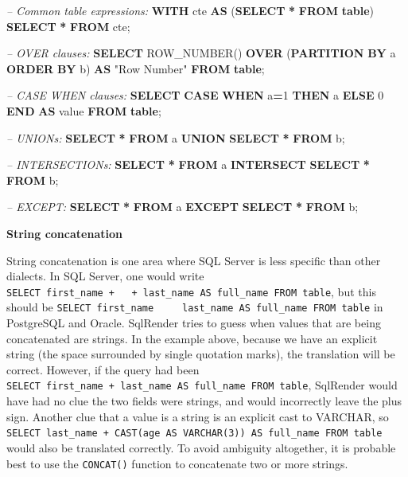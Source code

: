 \documentclass[11pt]{book}
\newenvironment{Shaded}{\begin{snugshade}}{\end{snugshade}}
\newcommand{\CommentTok}[1]{\textcolor[rgb]{0.56,0.35,0.01}{\textit{#1}}}
\newcommand{\ControlFlowTok}[1]{\textcolor[rgb]{0.13,0.29,0.53}{\textbf{#1}}}
\newcommand{\DecValTok}[1]{\textcolor[rgb]{0.00,0.00,0.81}{#1}}
\newcommand{\FunctionTok}[1]{\textcolor[rgb]{0.00,0.00,0.00}{#1}}
\newcommand{\KeywordTok}[1]{\textcolor[rgb]{0.13,0.29,0.53}{\textbf{#1}}}
\newcommand{\NormalTok}[1]{#1}
\newcommand{\OperatorTok}[1]{\textcolor[rgb]{0.81,0.36,0.00}{\textbf{#1}}}
\newcommand{\OtherTok}[1]{\textcolor[rgb]{0.56,0.35,0.01}{#1}}
\theoremstyle{definition}
\theoremstyle{definition}
\theoremstyle{definition}
\theoremstyle{remark}
\begin{document}
\begin{Shaded}
\begin{Highlighting}[]
\CommentTok{-- Common table expressions:}
\KeywordTok{WITH}\NormalTok{ cte }\KeywordTok{AS}\NormalTok{ (}\KeywordTok{SELECT} \OperatorTok{*} \KeywordTok{FROM} \KeywordTok{table}\NormalTok{) }\KeywordTok{SELECT} \OperatorTok{*} \KeywordTok{FROM}\NormalTok{ cte;}

\CommentTok{-- OVER clauses:}
\KeywordTok{SELECT} \FunctionTok{ROW_NUMBER}\NormalTok{() }\KeywordTok{OVER}\NormalTok{ (}\KeywordTok{PARTITION} \KeywordTok{BY}\NormalTok{ a }\KeywordTok{ORDER} \KeywordTok{BY}\NormalTok{ b)}
  \KeywordTok{AS} \OtherTok{"Row Number"} \KeywordTok{FROM} \KeywordTok{table}\NormalTok{;}
  
\CommentTok{-- CASE WHEN clauses:}
\KeywordTok{SELECT} \ControlFlowTok{CASE} \ControlFlowTok{WHEN}\NormalTok{ a}\OperatorTok{=}\DecValTok{1} \ControlFlowTok{THEN}\NormalTok{ a }\ControlFlowTok{ELSE} \DecValTok{0} \ControlFlowTok{END} \KeywordTok{AS} \FunctionTok{value} \KeywordTok{FROM} \KeywordTok{table}\NormalTok{;}

\CommentTok{-- UNIONs:}
\KeywordTok{SELECT} \OperatorTok{*} \KeywordTok{FROM}\NormalTok{ a }\KeywordTok{UNION} \KeywordTok{SELECT} \OperatorTok{*} \KeywordTok{FROM}\NormalTok{ b;}

\CommentTok{-- INTERSECTIONs:}
\KeywordTok{SELECT} \OperatorTok{*} \KeywordTok{FROM}\NormalTok{ a }\KeywordTok{INTERSECT} \KeywordTok{SELECT} \OperatorTok{*} \KeywordTok{FROM}\NormalTok{ b;}

\CommentTok{-- EXCEPT:}
\KeywordTok{SELECT} \OperatorTok{*} \KeywordTok{FROM}\NormalTok{ a }\KeywordTok{EXCEPT} \KeywordTok{SELECT} \OperatorTok{*} \KeywordTok{FROM}\NormalTok{ b;}
\end{Highlighting}
\end{Shaded}

\textbf{String concatenation}

String concatenation is one area where SQL Server is less specific than other dialects. In SQL Server, one would write \texttt{SELECT\ first\_name\ +\ \textquotesingle{}\ \textquotesingle{}\ +\ last\_name\ AS\ full\_name\ FROM\ table}, but this should be \texttt{SELECT\ first\_name\ \textbar{}\textbar{}\ \textquotesingle{}\ \textquotesingle{}\ \textbar{}\textbar{}\ last\_name\ AS\ full\_name\ FROM\ table} in PostgreSQL and Oracle. SqlRender tries to guess when values that are being concatenated are strings. In the example above, because we have an explicit string (the space surrounded by single quotation marks), the translation will be correct. However, if the query had been \texttt{SELECT\ first\_name\ +\ last\_name\ AS\ full\_name\ FROM\ table}, SqlRender would have had no clue the two fields were strings, and would incorrectly leave the plus sign. Another clue that a value is a string is an explicit cast to VARCHAR, so \texttt{SELECT\ last\_name\ +\ CAST(age\ AS\ VARCHAR(3))\ AS\ full\_name\ FROM\ table} would also be translated correctly. To avoid ambiguity altogether, it is probable best to use the \texttt{CONCAT()} function to concatenate two or more strings.
\end{document}
